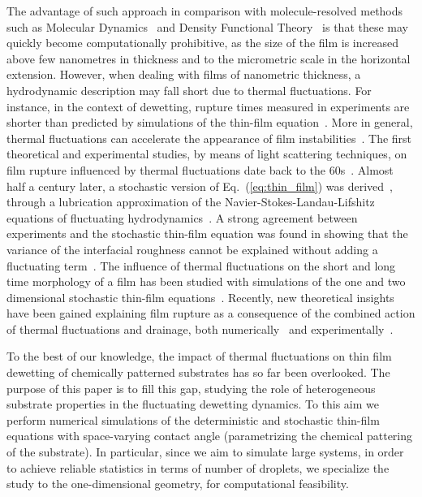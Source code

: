 The advantage of such approach in comparison with molecule-resolved methods such as Molecular Dynamics~\cite{haileMolecularDynamicsSimulation1997, zhangMolecularSimulationThin2019, wengMolecularDynamicsInvestigation2000, grabowThinFilmGrowth1988}
and Density Functional Theory~\cite{vanswolWettingDryingTransitions1989, tarazonaSimpleDensityFunctional1984, meisterDensityfunctionalTheoryInhomogeneous1985, hughesIntroductionInhomogeneousLiquids2014} is that these may quickly become computationally prohibitive, as the size of the film is increased above few nanometres in thickness and to the micrometric scale in the horizontal extension.
However, when dealing with films of nanometric thickness, a hydrodynamic description may fall short due to thermal fluctuations. 
For instance, in the context of dewetting, rupture times measured in experiments are shorter than predicted by simulations of the thin-film equation~\cite{bischofDewettingModesThin1996,herminghausSpinodalDewettingLiquid1998,beckerComplexDewettingScenarios2003}.
More in general, thermal fluctuations can accelerate the appearance of film instabilities~\cite{Rauscher2008,tsekov1993effect, fetzerThermalNoiseInfluences2007, zhangMolecularSimulationThin2019}.
The first theoretical and experimental studies, by means of light scattering techniques, on film rupture influenced by thermal fluctuations date back to the 60s~\cite{vrijRuptureThinLiquid1968}.
Almost half a century later, a stochastic version of Eq.~(\ref{eq:thin_film}) was derived~\cite{grunThinFilmFlowInfluenced2006, meckeThermalFluctuationsThin2005, davidovitchSpreadingViscousFluid2005}, through a lubrication approximation of the Navier-Stokes-Landau-Lifshitz equations of fluctuating hydrodynamics~\cite{landauFluidMechanicsLandau2013}.
A strong agreement between experiments and the stochastic thin-film equation was found in showing that the variance of the interfacial roughness cannot be explained without adding a fluctuating term~\cite{fetzerThermalNoiseInfluences2007}.
The influence of thermal fluctuations on the short and long time morphology of a film has been studied with simulations of the one and two dimensional stochastic thin-film equations~\cite{nesicFullyNonlinearDynamics2015, pahlavanThinFilmsPartial2018}. 
Recently, new theoretical insights have been gained explaining film rupture as a consequence of the combined action of thermal fluctuations and drainage, both numerically~\cite{shahThermalFluctuationsCapillary2019} and experimentally~\cite{chatzigiannakisBreakupThinLiquid2020}.

To the best of our knowledge, the impact of thermal fluctuations on thin film dewetting of chemically patterned substrates has so far been overlooked.
The purpose of this paper is to fill this gap, studying the role of heterogeneous substrate properties in the fluctuating dewetting dynamics.
To this aim we perform numerical simulations of the deterministic and stochastic thin-film equations with space-varying contact angle (parametrizing the chemical pattering of the substrate). 
In particular, since we aim to simulate large systems, in order to achieve reliable statistics in terms of number of droplets, we specialize the study to the one-dimensional geometry, for computational feasibility.

